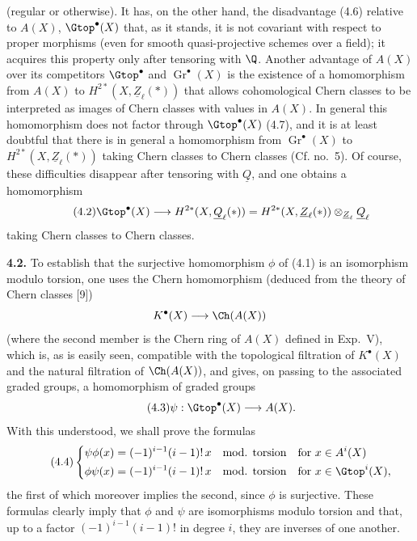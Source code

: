 %
(regular or otherwise). It has, on the other hand, the disadvantage (4.6) relative to $A(X)$, $\Gtop^\bullet(X)$ that, as it stands, it is not covariant with respect to proper morphisms (even for smooth quasi-projective schemes over a field); it acquires this property only after tensoring with $\Q$. Another advantage of $A(X)$ over its competitors $\Gtop^\bullet$ and $\operatorname{Gr}^\bullet(X)$ is the existence of a homomorphism from $A(X)$ to $H^{2*}(X,\underline{Z}_\ell(*))$ that allows cohomological Chern classes to be interpreted as images of Chern classes with values in $A(X)$. In general this homomorphism does not factor through $\Gtop^\bullet(X)$ (4.7), and it is at least doubtful that there is in general a homomorphism from $\operatorname{Gr}^\bullet(X)$ to $H^{2*}(X,\underline{Z}_\ell(*))$ taking Chern classes to Chern classes (Cf. no.~5). Of course, these difficulties disappear after tensoring with $\underline{Q}$, and one obtains a homomorphism
\begin{equation}\tag{4.2}
 \Gtop^\bullet(X)\longrightarrow H^{2*}(X,\underline{Q}_\ell(*))=
 H^{2*}(X,\underline{Z}_\ell(*))\otimes_{\underline{Z}_\ell}\underline{Q}_\ell
\end{equation}
taking Chern classes to Chern classes.

\textbf{4.2.} To establish that the surjective homomorphism $\phi$ of (4.1) is an isomorphism modulo torsion, one uses the Chern homomorphism (deduced from the theory of Chern classes [9])
\[
 K^\bullet(X)\longrightarrow \Ch(A(X))
\]
(where the second member is the Chern ring of $A(X)$ defined in Exp.~V), which is, as is easily seen, compatible with the topological filtration of $K^\bullet(X)$ and the natural filtration of $\Ch(A(X))$, and gives, on passing to the associated graded groups, a homomorphism of graded groups
\begin{equation}\tag{4.3}
 \psi:\Gtop^\bullet(X)\longrightarrow A(X).
\end{equation}
With this understood, we shall prove the formulas
\begin{equation}\tag{4.4}
\left\{
\begin{aligned}
 \psi\phi(x)&=(-1)^{i-1}(i-1)!\,x\quad \text{mod. torsion}\quad \text{for } x\in A^i(X)\\
 \phi\psi(x)&=(-1)^{i-1}(i-1)!\,x\quad \text{mod. torsion}\quad \text{for } x\in \Gtop^i(X),
\end{aligned}
\right.
\end{equation}
the first of which moreover implies the second, since $\phi$ is surjective. These formulas clearly imply that $\phi$ and $\psi$ are isomorphisms modulo torsion and that, up to a factor $(-1)^{i-1}(i-1)!$ in degree $i$, they are inverses of one another.

